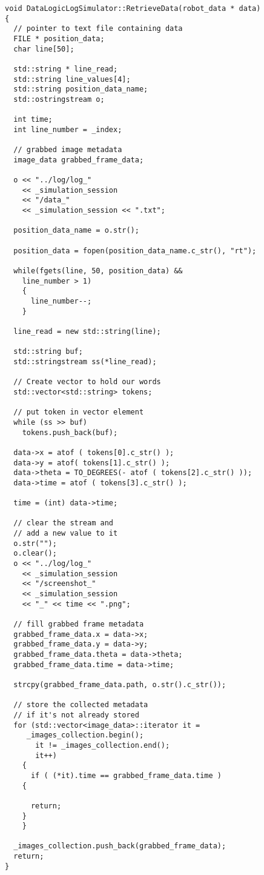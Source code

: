 \begin{lstlisting}[caption={\texttt{DataLogic::RetrieveData()} method}, label={code:retrievedata_method}, frame=trBL]
void DataLogicLogSimulator::RetrieveData(robot_data * data)
{
  // pointer to text file containing data
  FILE * position_data;
  char line[50];
  
  std::string * line_read;
  std::string line_values[4];
  std::string position_data_name;
  std::ostringstream o;
  
  int time;
  int line_number = _index;

  // grabbed image metadata
  image_data grabbed_frame_data;
  
  o << "../log/log_" 
    << _simulation_session 
    << "/data_" 
    << _simulation_session << ".txt";

  position_data_name = o.str();

  position_data = fopen(position_data_name.c_str(), "rt");

  while(fgets(line, 50, position_data) &&
	line_number > 1)
    {
      line_number--;
    }

  line_read = new std::string(line);

  std::string buf;
  std::stringstream ss(*line_read);

  // Create vector to hold our words
  std::vector<std::string> tokens;
  
  // put token in vector element
  while (ss >> buf)
    tokens.push_back(buf);

  data->x = atof ( tokens[0].c_str() );
  data->y = atof( tokens[1].c_str() );
  data->theta = TO_DEGREES(- atof ( tokens[2].c_str() ));
  data->time = atof ( tokens[3].c_str() );

  time = (int) data->time;

  // clear the stream and 
  // add a new value to it
  o.str("");
  o.clear();
  o << "../log/log_" 
    << _simulation_session 
    << "/screenshot_" 
    << _simulation_session 
    << "_" << time << ".png";

  // fill grabbed frame metadata
  grabbed_frame_data.x = data->x;
  grabbed_frame_data.y = data->y;
  grabbed_frame_data.theta = data->theta;
  grabbed_frame_data.time = data->time;

  strcpy(grabbed_frame_data.path, o.str().c_str());

  // store the collected metadata 
  // if it's not already stored
  for (std::vector<image_data>::iterator it =
	 _images_collection.begin();
       it != _images_collection.end();
       it++)
    {
      if ( (*it).time == grabbed_frame_data.time )
	{

	  return;
	}
    }

  _images_collection.push_back(grabbed_frame_data);
  return;
}
\end{lstlisting}

